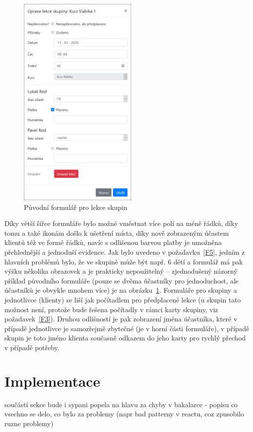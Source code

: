 \begin{figure}\centering
    \includegraphics[width=0.52\textwidth]{img/ui-screen-lekce-skupina.png}
    \caption{Původní formulář pro lekce skupin}\label{fig:ui-screen-lekce-skupina}
\end{figure}

Díky větší šířce formuláře bylo možné vměstnat více polí na méně řádků, díky tomu a také ikonám došlo k ušetření místa, díky nově zobrazeným účastem klientů též ve formě řádků, navíc s odlišenou barvou platby je umožněna přehlednější a jednoduší evidence. Jak bylo uvedeno v požadavku~\ref{F5}, jedním z hlavních problémů bylo, že ve skupině může být např. 6 dětí a formulář má pak výšku několika obrazovek a je prakticky nepoužitelný -- zjednodušený názorný příklad původního formuláře (pouze se dvěma účastníky pro jednoduchost, ale účastníků je obvykle mnohem více) je na obrázku~\ref{fig:ui-screen-lekce-skupina}. Formuláře pro skupiny a jednotlivce (klienty) se liší jak počítadlem pro předplacené lekce (u skupin tato možnost není, protože bude řešena počítadly v rámci karty skupiny, viz požadavek~\ref{F3}). Druhou odlišností je pak zobrazení jména účastníka, které v případě jednotlivce je samozřejmě zbytečné (je v horní části formuláře), v případě skupin je toto jméno klienta současně odkazem do jeho karty pro rychlý přechod v případě potřeby.

\chapter{Implementace}
součástí sekce bude i sypani popela na hlavu za chyby v bakalarce - popisu co vsechno se delo, co bylo za problemy (napr bad patterny v reactu, coz zpusobilo ruzne problemy)

